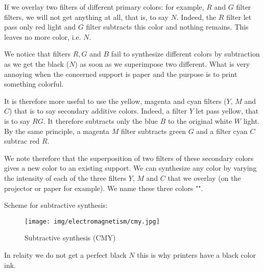 	If we overlay two filters of different primary colors: for example, $R$ and $G$ filter filters, we will not get anything at all, that is, to say $N$. Indeed, the $R$ filter let pass only red light and $G$ filter subtracts this color and nothing remains. This leaves no more color, i.e. $N$.
	
	We notice that filters $R, G$ and $B$ fail to synthesize different colors by subtraction as we get the black ($N$) as soon as we superimpose two different. What is very annoying when the concerned support is paper and the purpose is to print something colorful.
	
	It is therefore more useful to use the yellow, magenta and cyan filters ($Y$, $M$ and $C$) that is to say secondary additive colors. Indeed, a filter $Y$ let pass yellow, that is to say $RG$. It therefore subtracts only the blue $B$ to the original white $W$ light. By the same principle, a magenta $M$ filter subtracts green $G$ and a filter cyan $C$ subtrac red $R$.
	
	We note therefore that the superposition of two filters of these secondary colors gives a new color to an existing support. We can synthesize any color by varying the intensity of each of the three filters $Y$, $M$ and $C$ that we overlay (on the projector or paper for example). We name these three colors "".
	
	Scheme for subtractive synthesis:
	\begin{figure}[H]
		\centering
		\texttt{[image: img/electromagnetism/cmy.jpg]}
		\caption{Subtractive synthesis (CMY)}
	\end{figure}
	In relaity we do not get a perfect black $N$ this is why printers have a black color ink.
	
